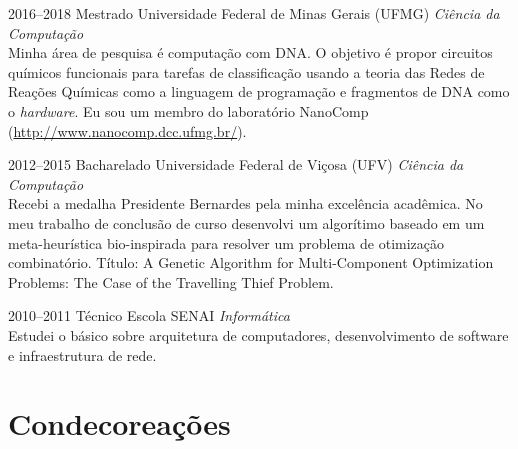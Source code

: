 \documentclass[a4paper]{cv-friggeri-x}
\begin{document}
\begin{entrylist}

\entry
    {2016--2018}
    {Mestrado}
    {Universidade Federal de Minas Gerais (UFMG)}
    {\emph{Ciência da Computação}\\
    Minha área de pesquisa é computação com DNA. O objetivo é propor circuitos químicos funcionais para tarefas de classificação usando a teoria das Redes de Reações Químicas como a linguagem de programação e fragmentos de DNA como o \textit{hardware}. Eu sou um membro do laboratório NanoComp (\href{http://www.nanocomp.dcc.ufmg.br/}{http://www.nanocomp.dcc.ufmg.br/}).}

\entry
    {2012--2015}
    {Bacharelado}
    {Universidade Federal de Vi\c cosa (UFV)}
    {\emph{Ciência da Computação}\\
    Recebi a medalha Presidente Bernardes pela minha excelência acadêmica. No meu trabalho de conclusão de curso desenvolvi um algorítimo baseado em um meta-heurística bio-inspirada para resolver um problema de otimização combinatório. Título: A Genetic Algorithm for Multi-Component Optimization Problems: The Case of the Travelling Thief Problem.}


\entry
    {2010--2011}
    {Técnico}
    {Escola SENAI}
    {\emph{Informática}\\
    Estudei o básico sobre arquitetura de computadores, desenvolvimento de software e infraestrutura de rede.}



\end{entrylist}


\section{Condecoreações}
\end{document}
